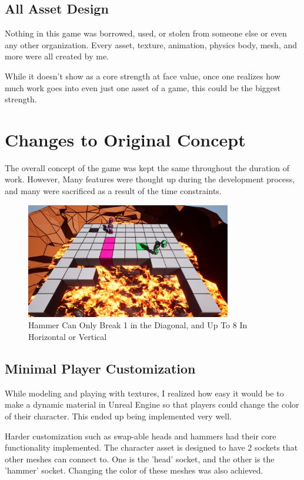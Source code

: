\documentclass[conference,compsoc]{IEEEtran}
\begin{document}
\subsection{All Asset Design}

Nothing in this game was borrowed, used, or stolen from someone else or even any other organization. Every asset, texture, animation, physics body, mesh, and more were all created by me.

While it doesn't show as a core strength at face value, once one realizes how much work goes into even just one asset of a game, this could be the biggest strength.

\section{Changes to Original Concept}

The overall concept of the game was kept the same throughout the duration of work. However, Many features were thought up during the development process, and many were sacrificed as a result of the time constraints.

\begin{figure}[t]
  \centering
  \includegraphics[width=0.8\textwidth]{blockscharging2.png}%
  \caption{Hammer Can Only Break 1 in the Diagonal, and Up To 8 In Horizontal or Vertical}
\end{figure}

\subsection{Minimal Player Customization}

While modeling and playing with textures, I realized how easy it would be to make a dynamic material in Unreal Engine so that players could change the color of their character. This ended up being implemented very well.

Harder customization such as swap-able heads and hammers had their core functionality implemented. The character asset is designed to have 2 sockets that other meshes can connect to. One is the 'head' socket, and the other is the 'hammer' socket. Changing the color of these meshes was also achieved.
\end{document}
